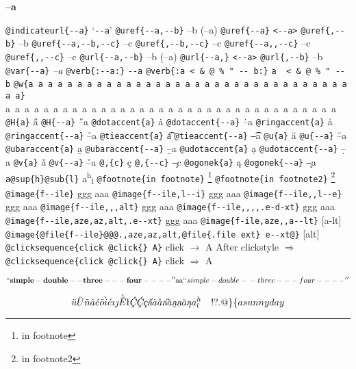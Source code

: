 \documentclass{book}
\begin{document}
{\Huge \bfseries --a

}
\texttt{@indicateurl\{{-}{-}a\}} `\texttt{{-}{-}a}'
\texttt{@uref\{{-}{-}a,{-}{-}b\}} --b (--a)
\texttt{@uref\{{-}{-}a\}} \texttt{<{-}{-}a>}
\texttt{@uref\{,{-}{-}b\}} --b
\texttt{@uref\{{-}{-}a,{-}{-}b,{-}{-}c\}} --c
\texttt{@uref\{,{-}{-}b,{-}{-}c\}} --c
\texttt{@uref\{{-}{-}a,,{-}{-}c\}} --c
\texttt{@uref\{,,{-}{-}c\}} --c
\texttt{@url\{{-}{-}a,{-}{-}b\}} --b (--a)
\texttt{@url\{{-}{-}a,\}} \texttt{<{-}{-}a>}
\texttt{@url\{,{-}{-}b\}} --b
\texttt{@var\{{-}{-}a\}} \emph{--a}
\texttt{@verb\{:{-}{-}a:\}} \verb:--a:
\texttt{@verb\{:a  < \& @ \% " {-}{-}    b:\}} \verb:a  < & @ % " --    b:
\texttt{@w\{a a a a a a a a a a a a a a a a a a a a a a a a a a a a a a a a a a a\}} \hbox{a a a a a a a a a a a a a a a a a a a a a a a a a a a a a a a a a a a}
\texttt{@H\{a\}} \H{a}
\texttt{@H\{{-}{-}a\}} \H{--a}
\texttt{@dotaccent\{a\}} \.{a}
\texttt{@dotaccent\{{-}{-}a\}} \.{--a}
\texttt{@ringaccent\{a\}} \r{a}
\texttt{@ringaccent\{{-}{-}a\}} \r{--a}
\texttt{@tieaccent\{a\}} \t{a}
\texttt{@tieaccent\{{-}{-}a\}} \t{--a}
\texttt{@u\{a\}} \u{a}
\texttt{@u\{{-}{-}a\}} \u{--a}
\texttt{@ubaraccent\{a\}} \b{a}
\texttt{@ubaraccent\{{-}{-}a\}} \b{--a}
\texttt{@udotaccent\{a\}} \d{a}
\texttt{@udotaccent\{{-}{-}a\}} \d{--a}
\texttt{@v\{a\}} \v{a}
\texttt{@v\{{-}{-}a\}} \v{--a}
\texttt{@,\{c\}} \c{c}
\texttt{@,\{{-}{-}c\}} \c{--c}
\texttt{@ogonek\{a\}} \k{a}
\texttt{@ogonek\{{-}{-}a\}} \k{--a}
\texttt{a@sup\{h\}@sub\{l\}} a\textsuperscript{h}\textsubscript{l}
\texttt{@footnote\{in footnote\}} \footnote{in footnote

}
\texttt{@footnote\{in footnote2\}} \footnote{in footnote2

}
\texttt{@image\{f{-}{-}ile\}} ggg
aaa
\texttt{@image\{f{-}{-}ile,l{-}{-}i\}} ggg
aaa
\texttt{@image\{f{-}{-}ile,,l{-}{-}e\}} ggg
aaa
\texttt{@image\{f{-}{-}ile,,,alt\}} ggg
aaa
\texttt{@image\{f{-}{-}ile,,,,.e-d-xt\}} ggg
aaa
\texttt{@image\{f{-}{-}ile,aze,az,alt,.e{-}{-}xt\}} ggg
aaa
\texttt{@image\{f-ile,aze,,a{-}{-}lt\}} [a-lt]
\texttt{@image\{@file\{f{-}{-}ile\}@@@.,aze,az,alt,@file\{.file ext\} e{-}{-}xt@\}} [alt]
\texttt{@clicksequence\{click @click\{\} A\}} click $\rightarrow{}$ A
After clickstyle $\Rightarrow{}$
\texttt{@clicksequence\{click @click\{\} A\}} click $\Rightarrow{}$ A


$$
\mathbf{``simple-double--three---four----''} \hbox{aa}
`\hbox{}`simple-double-\hbox{}-three---four----'\hbox{}'\leavevmode{}\\
$$


$$
\ddot{u} \ddot{U} \tilde{n} \hat{a} \acute{e} \bar{o} \grave{i} \acute{e} \imath{} \jmath{} \grave{\bar{E}}
\mathord{\text{\l{}}} \textsl{\c{\'{C}}} \textsl{\c{\'{C}}} \textsl{\c{c}} \textsl{\H{a}} \dot{a} \mathring{a} \textsl{\t{a}}
\breve{a} \textsl{\b{a}} \textsl{\d{a}} \check{a} \textsl{\k{a}} a^{h}_{l}
\leavevmode{}\\ \ {}\ {} \ {}\-{}   ! ? . @ \} \{ 
a sunny day
$$
\end{document}
